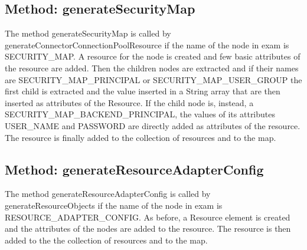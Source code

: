 \subsection{Method: generateSecurityMap}
The method generateSecurityMap is called by generateConnectorConnectionPoolResource if the name of the node in exam is SECURITY\_MAP. A resource for the node is created and few basic attributes of the resource are added. Then the children nodes are extracted and if their names are SECURITY\_MAP\_PRINCIPAL or SECURITY\_MAP\_USER\_GROUP the first child is extracted and the value inserted in a String array that are then inserted as attributes of the Resource. If the child node is, instead, a SECURITY\_MAP\_BACKEND\_PRINCIPAL, the values of its attributes USER\_NAME and PASSWORD are directly added as attributes of the resource. The resource is finally added to the collection of resources and to the map.

\subsection{Method: generateResourceAdapterConfig}
The method generateResourceAdapterConfig is called by generateResourceObjects if the name of the node in exam is RESOURCE\_ADAPTER\_CONFIG. As before, a Resource element is created and the attributes of the nodes are added to the resource. The resource is then added to the the collection of resources and to the map.